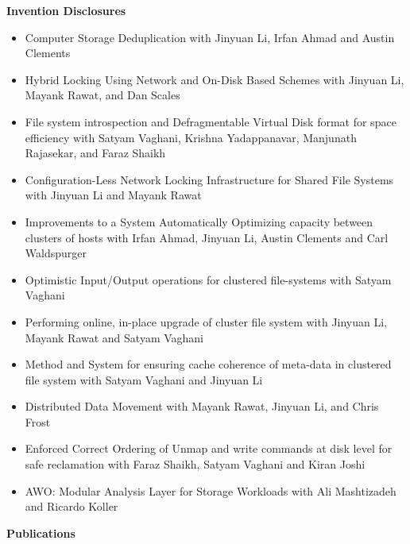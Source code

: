 \documentclass{article}
\begin{document}
\begin{center}
  \end{center}

\vspace*{-0.1truein}
  \large \textbf{Invention Disclosures}
  \small
\vspace*{-0.2truein}
  \begin{center}
  \begin{itemize}
  \item {Computer Storage Deduplication with Jinyuan Li, Irfan Ahmad and Austin Clements}
  \item {Hybrid Locking Using Network and On-Disk Based Schemes with Jinyuan
         Li, Mayank Rawat, and Dan Scales}
  \item {File system introspection and Defragmentable Virtual Disk
        format for space efficiency with Satyam Vaghani, Krishna Yadappanavar, Manjunath Rajasekar,
        and Faraz Shaikh}
  \item {Configuration-Less Network Locking Infrastructure for Shared
        File Systems with Jinyuan Li and Mayank Rawat}
  \item {Improvements to a System Automatically Optimizing capacity
        between clusters of hosts with Irfan Ahmad, Jinyuan Li, Austin Clements and Carl Waldspurger}
  \item {Optimistic Input/Output operations for clustered file-systems with Satyam Vaghani}
  \item {Performing online, in-place upgrade of cluster file system with Jinyuan Li, Mayank Rawat and
        Satyam Vaghani}
  \item {Method and System for ensuring cache coherence of meta-data in clustered file system with Satyam Vaghani and Jinyuan Li}
  \item {Distributed Data Movement with Mayank Rawat, Jinyuan Li, and Chris Frost}
  \item {Enforced Correct Ordering of Unmap and write commands at disk level for safe reclamation with Faraz Shaikh, Satyam Vaghani and
         Kiran Joshi}
  \item {AWO: Modular Analysis Layer for Storage Workloads with Ali Mashtizadeh and Ricardo Koller}
  \end{itemize}
  \end{center}




\vspace*{-0.1truein}
  \large \textbf{Publications}
  \normalsize
\vspace*{-0.1truein}
\end{document}
